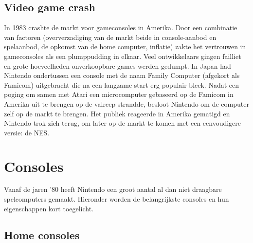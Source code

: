 \documentclass{article}
\begin{document}
\subsection{Video game crash}
In 1983 crashte de markt voor gameconsoles in Amerika. Door een combinatie van factoren (oververzadiging van de markt beide in console-aanbod en spelaanbod, de opkomst van de home computer, inflatie) zakte het vertrouwen in gameconsoles als een plumppudding in elkaar.
Veel ontwikkelaars gingen failliet en grote hoeveelheden onverkoopbare games werden gedumpt. In Japan had Nintendo ondertussen een console met de naam Family Computer (afgekort als Famicom) uitgebracht die na een langzame start erg populair bleek. Nadat een poging om samen met Atari een microcomputer gebaseerd op de Famicom in Amerika uit te brengen op de valreep strandde, besloot Nintendo om de computer zelf op de markt te brengen. Het publiek reageerde in Amerika gematigd en Nintendo trok zich terug, om later op de markt te komen met een eenvoudigere versie: de NES. 

\section{Consoles}
Vanaf de jaren '80 heeft Nintendo een groot aantal al dan niet draagbare spelcomputers gemaakt. Hieronder worden de belangrijkste consoles en hun eigenschappen kort toegelicht. 
\subsection{Home consoles}
\end{document}
